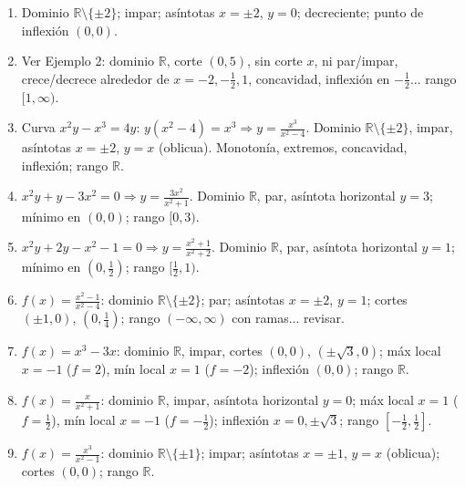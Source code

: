 \documentclass[12pt, letterpaper]{article}
\begin{document}
\begin{enumerate}[leftmargin=*, label=\textbf{\arabic*.}]
    \item Dominio $\mathbb{R}\setminus\{\pm2\}$; impar; asíntotas $x=\pm2$, $y=0$; decreciente; punto de inflexión $(0,0)$.
    \item Ver Ejemplo 2: dominio $\mathbb{R}$, corte $(0,5)$, sin corte $x$, ni par/impar, crece/decrece alrededor de $x=-2,-\frac{1}{2},1$, concavidad, inflexión en $-\frac{1}{2}$... rango $[1,\infty)$.
    \item Curva $x^2y - x^3 = 4y$: $y(x^2-4) = x^3 \Rightarrow y = \frac{x^3}{x^2-4}$. Dominio $\mathbb{R}\setminus\{\pm 2\}$, impar, asíntotas $x=\pm2$, $y=x$ (oblicua). Monotonía, extremos, concavidad, inflexión; rango $\mathbb{R}$.
    \item $x^2y+y-3x^2=0 \Rightarrow y = \frac{3x^2}{x^2+1}$. Dominio $\mathbb{R}$, par, asíntota horizontal $y=3$; mínimo en $(0,0)$; rango $[0,3)$.
    \item $x^2y+2y-x^2-1=0 \Rightarrow y = \frac{x^2+1}{x^2+2}$. Dominio $\mathbb{R}$, par, asíntota horizontal $y=1$; mínimo en $(0,\frac{1}{2})$; rango $[\frac{1}{2},1)$.
    \item $f(x)=\frac{x^2-1}{x^2-4}$: dominio $\mathbb{R}\setminus\{\pm2\}$; par; asíntotas $x=\pm2$, $y=1$; cortes $(\pm1,0)$, $(0,\frac{1}{4})$; rango $(-\infty,\infty)$ con ramas... revisar.
    \item $f(x)=x^3-3x$: dominio $\mathbb{R}$, impar, cortes $(0,0)$, $(\pm\sqrt{3},0)$; máx local $x=-1$ ($f=2$), mín local $x=1$ ($f=-2$); inflexión $(0,0)$; rango $\mathbb{R}$.
    \item $f(x)=\frac{x}{x^2+1}$: dominio $\mathbb{R}$, impar, asíntota horizontal $y=0$; máx local $x=1$ ($f=\frac{1}{2}$), mín local $x=-1$ ($f=-\frac{1}{2}$); inflexión $x=0, \pm\sqrt{3}$; rango $[-\frac{1}{2},\frac{1}{2}]$.
    \item $f(x)=\frac{x^3}{x^2-1}$: dominio $\mathbb{R}\setminus\{\pm1\}$; impar; asíntotas $x=\pm1$, $y=x$ (oblicua); cortes $(0,0)$; rango $\mathbb{R}$.

  \end{enumerate}
\fi
\end{document}
